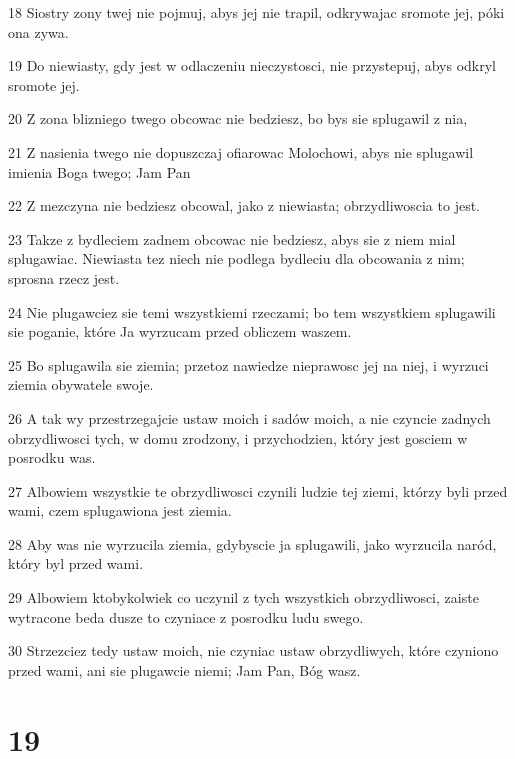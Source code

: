 \par 18 Siostry zony twej nie pojmuj, abys jej nie trapil, odkrywajac sromote jej, póki ona zywa.
\par 19 Do niewiasty, gdy jest w odlaczeniu nieczystosci, nie przystepuj, abys odkryl sromote jej.
\par 20 Z zona blizniego twego obcowac nie bedziesz, bo bys sie splugawil z nia,
\par 21 Z nasienia twego nie dopuszczaj ofiarowac Molochowi, abys nie splugawil imienia Boga twego; Jam Pan
\par 22 Z mezczyna nie bedziesz obcowal, jako z niewiasta; obrzydliwoscia to jest.
\par 23 Takze z bydleciem zadnem obcowac nie bedziesz, abys sie z niem mial splugawiac. Niewiasta tez niech nie podlega bydleciu dla obcowania z nim; sprosna rzecz jest.
\par 24 Nie plugawciez sie temi wszystkiemi rzeczami; bo tem wszystkiem splugawili sie poganie, które Ja wyrzucam przed obliczem waszem.
\par 25 Bo splugawila sie ziemia; przetoz nawiedze nieprawosc jej na niej, i wyrzuci ziemia obywatele swoje.
\par 26 A tak wy przestrzegajcie ustaw moich i sadów moich, a nie czyncie zadnych obrzydliwosci tych, w domu zrodzony, i przychodzien, który jest gosciem w posrodku was.
\par 27 Albowiem wszystkie te obrzydliwosci czynili ludzie tej ziemi, którzy byli przed wami, czem splugawiona jest ziemia.
\par 28 Aby was nie wyrzucila ziemia, gdybyscie ja splugawili, jako wyrzucila naród, który byl przed wami.
\par 29 Albowiem ktobykolwiek co uczynil z tych wszystkich obrzydliwosci, zaiste wytracone beda dusze to czyniace z posrodku ludu swego.
\par 30 Strzezciez tedy ustaw moich, nie czyniac ustaw obrzydliwych, które czyniono przed wami, ani sie plugawcie niemi; Jam Pan, Bóg wasz.

\chapter{19}

